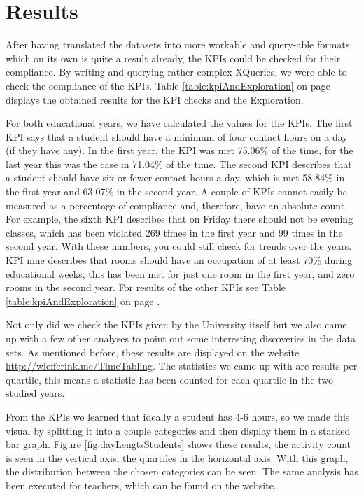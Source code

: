 \section{Results}
After having translated the datasets into more workable and query-able formats, which on its own is quite a result already, the KPIs could be checked for their compliance. By writing and querying rather complex XQueries, we were able to check the compliance of the KPIs. Table \ref{table:kpiAndExploration} on page \pageref{table:kpiAndExploration} displays the obtained results for the KPI checks and the Exploration.

For both educational years, we have calculated the values for the KPIs. The first KPI says that a student should have a minimum of four contact hours on a day (if they have any). In the first year, the KPI was met 75.06\% of the time, for the last year this was the case in 71.04\% of the time. The second KPI describes that a student should have six or fewer contact hours a day, which is met 58.84\% in the first year and 63.07\% in the second year. A couple of KPIs cannot easily be measured as a percentage of compliance and, therefore, have an absolute count. For example, the sixth KPI describes that on Friday there should not be evening classes, which has been violated 269 times in the first year and 99 times in the second year. With these numbers, you could still check for trends over the years. KPI nine describes that rooms should have an occupation of at least 70\% during educational weeks, this has been met for just one room in the first year, and zero rooms in the second year. For results of the other KPIs see Table \ref{table:kpiAndExploration}  on page \pageref{table:kpiAndExploration}.

Not only did we check the KPIs given by the University itself but we also came up with a few other analyses to point out some interesting discoveries in the data sets. As mentioned before, these results are displayed on the website \url{http://wiefferink.me/TimeTabling}. The statistics we came up with are results per quartile, this means a statistic has been counted for each quartile in the two studied years.

From the KPIs we learned that ideally a student has 4-6 hours, so we made this visual by splitting it into a couple categories and then display them in a stacked bar graph. Figure \ref{fig:dayLengtsStudents} shows these results, the activity count is seen in the vertical axis, the quartiles in the horizontal axis. With this graph, the distribution between the chosen categories can be seen. The same analysis has been executed for teachers, which can be found on the website.

